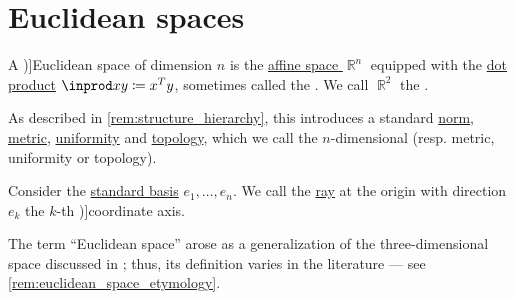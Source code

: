 \section{Euclidean spaces}\label{sec:euclidean_spaces}

\begin{definition}\label{def:euclidean_space}\mimprovised
  A \term[ru=Евклидово пространство (\cite[40]{Вулих1973ВещественныйАнализ})]{Euclidean space} of dimension \( n \) is the \hyperref[def:affine_space]{affine space \( \BbbR^n \)} equipped with the \hyperref[def:inner_product_space]{dot product} \( \inprod x y \coloneqq x^T y \), sometimes called the . We call \( \BbbR^2 \) the .

  As described in \cref{rem:structure_hierarchy}, this introduces a standard \hyperref[def:norm]{norm}, \hyperref[def:metric_space]{metric}, \hyperref[def:uniform_space]{uniformity} and \hyperref[def:topological_space]{topology}, which we call the \( n \)-dimensional  (resp. metric, uniformity or topology).

  Consider the \hyperref[def:coordinate_space]{standard basis} \( e_1, \ldots, e_n \). We call the \hyperref[def:geometric_ray]{ray} at the origin with direction \( e_k \) the \( k \)-th \term[ru=координатная ось (\cite[39]{Вулих1973ВещественныйАнализ})]{coordinate axis}.

\end{definition}
\begin{comments}
  \item The term \enquote{Euclidean space} arose as a generalization of the three-dimensional space discussed in \cite{Euclid2008Elements}; thus, its definition varies in the literature --- see \cref{rem:euclidean_space_etymology}.
\end{comments}

